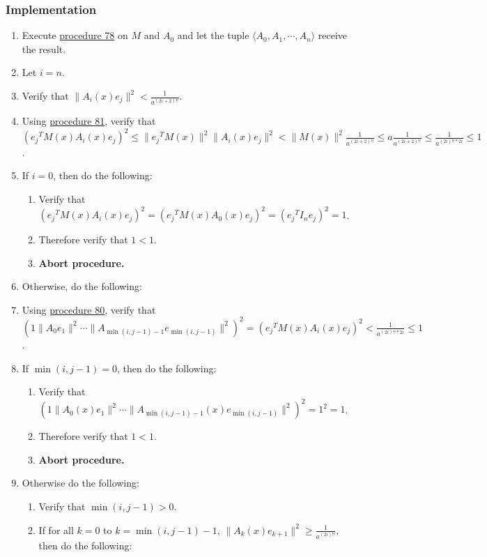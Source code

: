 \documentclass[twocolumn]{article}
\begin{document}
			\subsubsection{Implementation}
				\begin{enumerate}
					\item Execute \hyperref[sec:procedure 78]{procedure 78} on $M$ and $A_0$ and let the tuple $\langle A_0,A_1,\cdots,A_n\rangle$ receive the result.
					\item Let $i=n$.
					\item Verify that $\lVert A_i(x)e_j\rVert^2<\frac{1}{a^{(2i+2)!!}}$.
					\item Using \hyperref[sec:procedure 81]{procedure 81}, verify that $({e_j}^TM(x)A_i(x)e_j)^2\le\lVert{e_j}^TM(x)\rVert^2\lVert A_i(x)e_j\rVert^2<\lVert M(x)\rVert^2\frac{1}{a^{(2i+2)!!}}\le a\frac{1}{a^{(2i+2)!!}}\le\frac{1}{a^{(2i)!!*2i}}\le 1$.
					\item If $i=0$, then do the following:
					\begin{enumerate}
						\item Verify that $({e_j}^TM(x)A_i(x)e_j)^2=({e_j}^TM(x)A_0(x)e_j)^2=({e_j}^TI_ne_j)^2=1$.
						\item Therefore verify that $1<1$.
						\item \textbf{Abort procedure.}
					\end{enumerate}
					\item Otherwise, do the following:
					\item Using \hyperref[sec:procedure 80]{procedure 80}, verify that $(1\lVert A_0e_1\rVert^2\cdots\lVert A_{\min(i,j-1)-1}e_{\min(i,j-1)}\rVert^2)^2=({e_j}^TM(x)A_i(x)e_j)^2<\frac{1}{a^{(2i)!!*2i}}\le 1$.
					\item If $\min(i,j-1)=0$, then do the following:
					\begin{enumerate}
						\item Verify that $(1\lVert A_0(x)e_1\rVert^2\cdots\allowbreak\lVert A_{\min(i,j-1)-1}(x)e_{\min(i,j-1)}\rVert^2)^2=1^2=1$.
						\item Therefore verify that $1<1$.
						\item \textbf{Abort procedure.}
					\end{enumerate}
					\item Otherwise do the following:
					\begin{enumerate}
						\item Verify that $\min(i,j-1)>0$.
						\item If for all $k=0$ to $k=\min(i,j-1)-1$, $\lVert A_k(x)e_{k+1}\rVert^2\ge\frac{1}{a^{(2i)!!}}$, then do the following:

\end{enumerate}
\end{enumerate}
\end{document}
